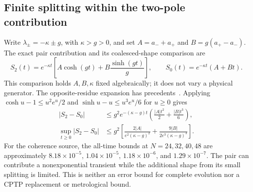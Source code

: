 \documentclass[aps,pra,10pt,onecolumn,superscriptaddress,amsmath,amssymb]{revtex4-2}
\begin{document}
\subsection{Finite splitting within the two-pole contribution}
Write $\lambda_\pm=-\kappa\pm g$, with $\kappa>g>0$, and set $A=a_-+a_+$ and $B=g(a_+-a_-)$. The exact pair contribution and its coalesced-shape comparison are
\begin{equation}
 S_2(t)=e^{-\kappa t}\left[A\cosh(gt)+B\frac{\sinh(gt)}{g}\right],\qquad
 S_0(t)=e^{-\kappa t}(A+Bt).
\end{equation}
This comparison holds $A,B,\kappa$ fixed algebraically; it does not vary a physical generator. The opposite-residue expansion has precedents~\cite{Molina2026}. Applying $\cosh u-1\le u^2e^u/2$ and $\sinh u-u\le u^3e^u/6$ for $u\ge0$ gives
\begin{align}
 |S_2-S_0|&\le g^2e^{-(\kappa-g)t}
 \left(\frac{|A|t^2}{2}+\frac{|B|t^3}{6}\right),\\
 \sup_{t\ge0}|S_2-S_0|&\le g^2\left[
 \frac{2|A|}{e^2(\kappa-g)^2}+\frac{9|B|}{2e^3(\kappa-g)^3}\right].
 \label{eq:pairbound}
\end{align}
For the coherence source, the all-time bounds at $N=24,32,40,48$ are approximately $8.18\times10^{-5}$, $1.04\times10^{-5}$, $1.18\times10^{-6}$, and $1.29\times10^{-7}$. The pair can contribute a nonexponential transient while the additional shape from its small splitting is limited. This is neither an error bound for complete evolution nor a CPTP replacement or metrological bound.
\end{document}
